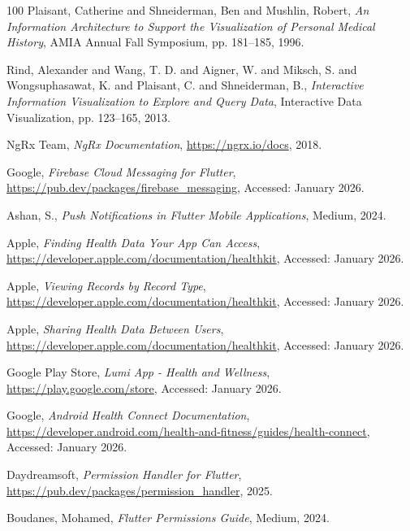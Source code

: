 \begin{thebibliography}{100}
  Plaisant, Catherine and Shneiderman, Ben and Mushlin, Robert,
  \textit{An Information Architecture to Support the Visualization of Personal Medical History},
  AMIA Annual Fall Symposium, pp. 181--185, 1996.

  Rind, Alexander and Wang, T. D. and Aigner, W. and Miksch, S. and Wongsuphasawat, K. and Plaisant, C. and Shneiderman, B.,
  \textit{Interactive Information Visualization to Explore and Query Data},
  Interactive Data Visualization, pp. 123--165, 2013.

  NgRx Team,
  \textit{NgRx Documentation},
  \url{https://ngrx.io/docs}, 2018.

  Google,
  \textit{Firebase Cloud Messaging for Flutter},
  \url{https://pub.dev/packages/firebase_messaging}, Accessed: January 2026.

  Ashan, S.,
  \textit{Push Notifications in Flutter Mobile Applications},
  Medium, 2024.

  Apple,
  \textit{Finding Health Data Your App Can Access},
  \url{https://developer.apple.com/documentation/healthkit}, Accessed: January 2026.

  Apple,
  \textit{Viewing Records by Record Type},
  \url{https://developer.apple.com/documentation/healthkit}, Accessed: January 2026.

  Apple,
  \textit{Sharing Health Data Between Users},
  \url{https://developer.apple.com/documentation/healthkit}, Accessed: January 2026.

  Google Play Store,
  \textit{Lumi App - Health and Wellness},
  \url{https://play.google.com/store}, Accessed: January 2026.

  Google,
  \textit{Android Health Connect Documentation},
  \url{https://developer.android.com/health-and-fitness/guides/health-connect}, Accessed: January 2026.


  Daydreamsoft,
  \textit{Permission Handler for Flutter},
  \url{https://pub.dev/packages/permission_handler}, 2025.

  Boudanes, Mohamed,
  \textit{Flutter Permissions Guide},
  Medium, 2024.


\end{thebibliography}
